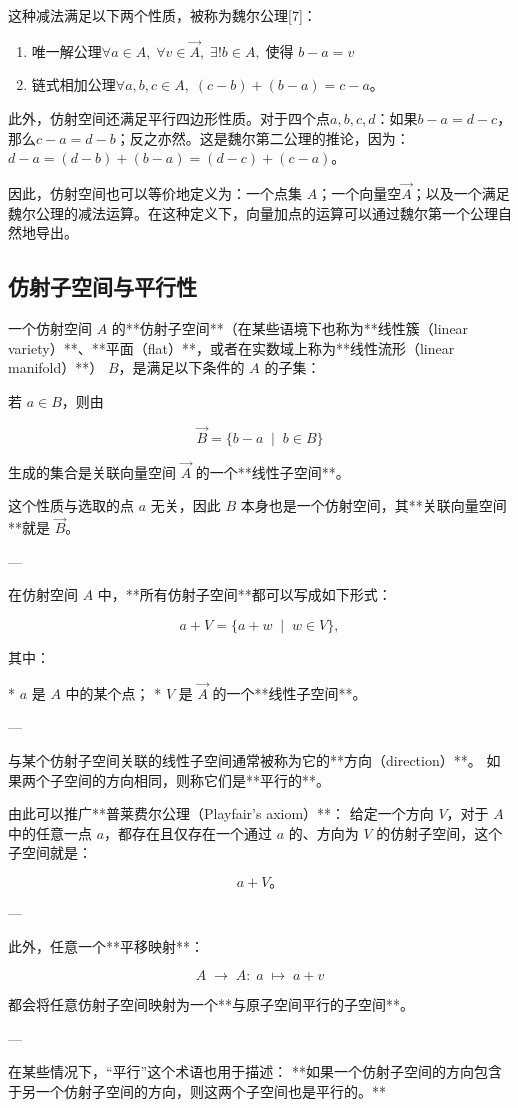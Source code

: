 这种减法满足以下两个性质，被称为魏尔公理[7]：
\begin{enumerate}
\item 唯一解公理$\forall a \in A, \;\forall v \in \overrightarrow{A}, \;\exists! b \in A, \;\text{使得 } b - a = v$
\item 链式相加公理$\forall a, b, c \in A, \;(c - b) + (b - a) = c - a$。
\end{enumerate}
此外，仿射空间还满足平行四边形性质。对于四个点$a, b, c, d$：如果$b - a = d - c$，那么$c - a = d - b$；反之亦然。这是魏尔第二公理的推论，因为：$
d - a = (d - b) + (b - a) = (d - c) + (c - a)$。

因此，仿射空间也可以等价地定义为：一个点集 $A$；一个向量空$\overrightarrow{A}$；以及一个满足魏尔公理的减法运算。在这种定义下，向量加点的运算可以通过魏尔第一个公理自然地导出。
\subsection{仿射子空间与平行性}
一个仿射空间 $A$ 的**仿射子空间**（在某些语境下也称为**线性簇（linear variety）**、**平面（flat）**，或者在实数域上称为**线性流形（linear manifold）**） $B$，是满足以下条件的 $A$ 的子集：

若 $a \in B$，则由

$$
\overrightarrow{B} = \{ b - a \;\mid\; b \in B \}
$$

生成的集合是关联向量空间 $\overrightarrow{A}$ 的一个**线性子空间**。

这个性质与选取的点 $a$ 无关，因此 $B$ 本身也是一个仿射空间，其**关联向量空间**就是 $\overrightarrow{B}$。

---

在仿射空间 $A$ 中，**所有仿射子空间**都可以写成如下形式：

$$
a + V = \{ a + w \;\mid\; w \in V \},
$$

其中：

* $a$ 是 $A$ 中的某个点；
* $V$ 是 $\overrightarrow{A}$ 的一个**线性子空间**。

---

与某个仿射子空间关联的线性子空间通常被称为它的**方向（direction）**。
如果两个子空间的方向相同，则称它们是**平行的**。

由此可以推广**普莱费尔公理（Playfair's axiom）**：
给定一个方向 $V$，对于 $A$ 中的任意一点 $a$，都存在且仅存在一个通过 $a$ 的、方向为 $V$ 的仿射子空间，这个子空间就是：

$$
a + V。
$$

---

此外，任意一个**平移映射**：

$$
A \;\to\; A :\; a \;\mapsto\; a + v
$$

都会将任意仿射子空间映射为一个**与原子空间平行的子空间**。

---

在某些情况下，“平行”这个术语也用于描述：
**如果一个仿射子空间的方向包含于另一个仿射子空间的方向，则这两个子空间也是平行的。**
